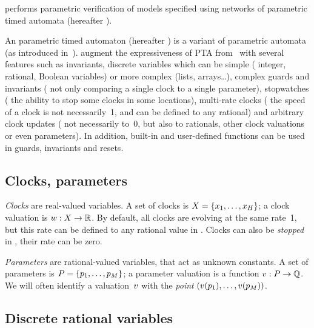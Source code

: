 \imitator{} performs parametric verification of models specified using networks of \imitator{} parametric timed automata (hereafter \NIPTA{}).

An \imitator{} parametric timed automaton (hereafter \IPTA{}) is a variant of parametric automata (as introduced in~\cite{AHV93}).
\IPTA{} augment the expressiveness of PTA from~\cite{AHV93} with several features such as invariants, discrete variables which can be simple (\eg{} integer, rational, Boolean variables) or more complex (lists, arrays…), complex guards and invariants (\ie{} not only comparing a single clock to a single parameter), stopwatches (\ie{} the ability to stop some clocks in some locations), multi-rate clocks (\ie{} the speed of a clock is not necessarily~1, and can be defined to any rational) and arbitrary clock updates (\ie{} not necessarily to~0, but also to rationals, other clock valuations or even parameters).
In addition, built-in and user-defined functions can be used in guards, invariants and resets.


\subsection{Clocks, parameters}

\emph{Clocks} are real-valued variables.
A set of clocks is $X = \{ x_1, \dots, x_H \}$;
a clock valuation is
$w : X \rightarrow \mathbb R$.
By default, all clocks are evolving at the same rate~1, but this rate can be defined to any rational value in \imitator{}.
Clocks can also be \emph{stopped} in \imitator{}, \ie{} their rate can be zero.

\emph{Parameters} are rational-valued variables, that act as unknown constants.
A set of parameters is $P = \{ p_1, \dots, p_M \} $;
a parameter valuation is a function $v : P \rightarrow \mathbb Q$.
We will often identify a valuation~$v$ with the \emph{point} $(v(p_1), \dots, v(p_{M}))$.


\subsection{Discrete rational variables}\label{subsection:rational}

